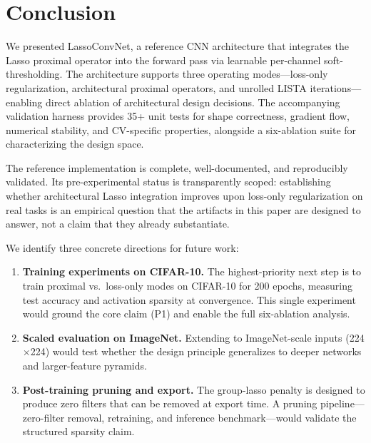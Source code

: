 \documentclass{article}
\begin{document}
\section{Conclusion}
\label{sec:conclusion}

We presented LassoConvNet, a reference CNN architecture that integrates the
Lasso proximal operator into the forward pass via learnable per-channel
soft-thresholding. The architecture supports three operating modes---loss-only
regularization, architectural proximal operators, and unrolled LISTA
iterations---enabling direct ablation of architectural design decisions. The
accompanying validation harness provides 35+ unit tests for shape correctness,
gradient flow, numerical stability, and CV-specific properties, alongside a
six-ablation suite for characterizing the design space.

The reference implementation is complete, well-documented, and reproducibly
validated. Its pre-experimental status is transparently scoped: establishing
whether architectural Lasso integration improves upon loss-only regularization
on real tasks is an empirical question that the artifacts in this paper are
designed to answer, not a claim that they already substantiate.

We identify three concrete directions for future work:

\begin{enumerate}
    \item \textbf{Training experiments on CIFAR-10.} The highest-priority
          next step is to train proximal vs.\ loss-only modes on CIFAR-10
          for 200 epochs, measuring test accuracy and activation sparsity at
          convergence. This single experiment would ground the core claim
          (P1) and enable the full six-ablation analysis.
    \item \textbf{Scaled evaluation on ImageNet.} Extending to ImageNet-scale
          inputs (224$\times$224) would test whether the design principle
          generalizes to deeper networks and larger-feature pyramids.
    \item \textbf{Post-training pruning and export.} The group-lasso penalty
          is designed to produce zero filters that can be removed at export
          time. A pruning pipeline---zero-filter removal, retraining, and
          inference benchmark---would validate the structured sparsity claim.
\end{enumerate}

\end{document}
